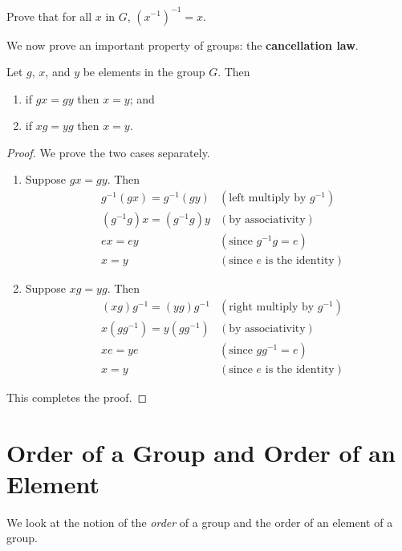 \begin{exercise}
Prove that for all $x$ in $G$, $\left(x^{-1}\right)^{-1} = x$.
\end{exercise}

We now prove an important property of groups: the \textbf{cancellation law}.
\begin{proposition}
    Let $g$, $x$, and $y$ be elements in the group $G$. Then
    \begin{enumerate}
        \item if $gx=gy$ then $x = y$; and
        \item if $xg=yg$ then $x = y$.
    \end{enumerate}
\end{proposition}
\begin{proof}
    We prove the two cases separately.
    \begin{enumerate}
        \item Suppose $gx = gy$. Then
        \begin{align*}
            &g^{-1}(gx) = g^{-1}(gy) & (\text{left multiply by } g^{-1})\\
            &(g^{-1}g)x = (g^{-1}g)y & (\text{by associativity})\\
            &ex = ey & (\text{since } g^{-1}g = e)\\
            &x = y & (\text{since } e \text{ is the identity})
        \end{align*}
        \item Suppose $xg = yg$. Then
        \begin{align*}
            &(xg)g^{-1} = (yg)g^{-1} & (\text{right multiply by } g^{-1})\\
            &x(gg^{-1}) = y(gg^{-1}) & (\text{by associativity})\\
            &xe = ye & (\text{since } gg^{-1} = e)\\
            &x = y & (\text{since } e \text{ is the identity})
        \end{align*}
    \end{enumerate}
    This completes the proof.
\end{proof}

\section{Order of a Group and Order of an Element}
We look at the notion of the \textit{order} of a group and the order of an element of a group.

